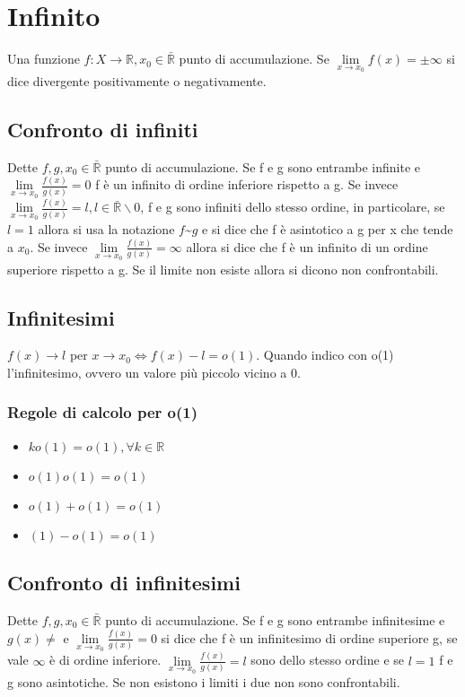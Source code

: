\chapter{Infinito}
Una funzione $f:X\rightarrow \mathbb{R}, x_0\in\bar{\mathbb{R}}$ punto di accumulazione. Se $\lim\limits_{x\rightarrow x_0}f(x)=\pm\infty$ si dice divergente positivamente o 
negativamente.
\section{Confronto di infiniti}
Dette $f,g,x_0\in\bar{\mathbb{R}}$ punto di accumulazione. Se f e g sono entrambe infinite e $\lim\limits_{x\rightarrow x_0}\frac{f(x)}{g(x)}=0$ f \`e un infinito di ordine 
inferiore rispetto a g. Se invece $\lim\limits_{x\rightarrow x_0}\frac{f(x)}{g(x)}=l, l\in\bar{\mathbb{R}}\backslash 0$, f e g sono infiniti dello stesso ordine, in particolare, se
$l=1$ allora si usa la notazione $f$\textasciitilde$g$ e si dice che f \`e asintotico a g per x che tende a $x_0$. Se invece $\lim\limits_{x\rightarrow x_0}\frac{f(x)}{g(x)}=\infty$
allora si dice che f \`e un infinito di un ordine superiore rispetto a g. Se il limite non esiste allora si dicono non confrontabili.   
\section{Infinitesimi}
$f(x)\rightarrow l $ per $x\rightarrow x_0\Leftrightarrow f(x)-l=o(1)$. Quando indico con o(1) l'infinitesimo, ovvero un valore pi\`u piccolo vicino a 0.
\subsection{Regole di calcolo per o(1)}
\begin{itemize}
\item $ko(1)=o(1),\forall k\in\mathbb{R}$
\item $o(1)o(1)=o(1)$
\item $o(1)+o(1)=o(1)$
\item $(1)-o(1)=o(1)$
\end{itemize}
\section{Confronto di infinitesimi}
Dette $f,g,x_0\in\bar{\mathbb{R}}$ punto di accumulazione. Se f e g sono entrambe infinitesime e $g(x)\neq $ e $\lim\limits_{x\rightarrow x_0}\frac{f(x)}{g(x)}=0$ si dice che f \`e 
un infinitesimo di ordine superiore g, se vale $\infty$ \`e di ordine inferiore.  $\lim\limits_{x\rightarrow x_0}\frac{f(x)}{g(x)}=l$ sono dello stesso ordine e se $l=1$ f e g sono 
asintotiche. Se non esistono i limiti i due non sono confrontabili.